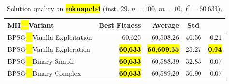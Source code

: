 \documentclass[mathematics,article,accept,moreauthors]{Definitions/mdpi}
\begin{document}
\vspace{-9pt}

\begin{table}[H]
  \small
  \caption{Solution quality on \textbf{\hl{mknapcb4}} (inst. 29, $n=100$, $m=10$, $f^*=60\,633$).}
  \label{tab:calidad_mknapcb4_29}
  \begin{tabularx}{\textwidth}{lRRRR}
    \toprule
    \textbf{MH\hl{---}Variant} &
    \textbf{Best Fitness} &
    \textbf{Average} &
    \textbf{Std.} &
    \textbf{} \\
    \midrule
    BPSO\hl{---}Vanilla Exploitation &          60,625 &         60,508.26 &  46.56 &         0.21 \\
    BPSO\hl{---}Vanilla Exploration  & \textbf{\hl{60,633}} & \textbf{\hl{60,609.65}} &  25.27 & \textbf{\hl{0.04}} \\
    BPSO\hl{---}Binary-Simple        & \textbf{\hl{60,633}} &         60,588.39 &  32.83 &         0.07 \\
    BPSO\hl{---}Binary-Complex       & \textbf{\hl{60,633}} &         60,589.29 &  36.90 &         0.07 \\


\bottomrule
\end{tabularx} %
\end{table}
\end{document}
